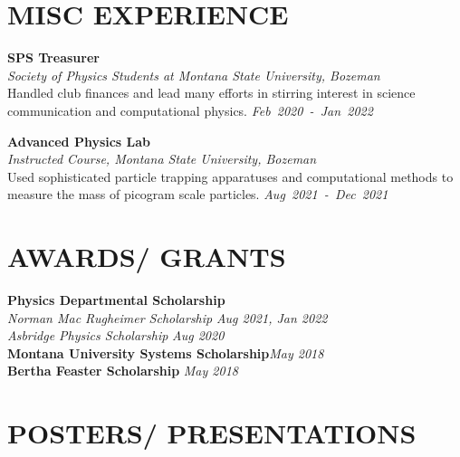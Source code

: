 \documentclass[margin]{res}
\begin{document}
\begin{resume}
\section{MISC EXPERIENCE}
\noindent
\raggedright
\textbf{\textbf{SPS Treasurer}}\\
{\sl Society of Physics Students at Montana State University, Bozeman}\\\vspace{0.5ex}
Handled club finances and lead many efforts in stirring interest in science communication and computational physics.   \hfill
{\sl Feb~2020~-~Jan~2022}

\noindent
\raggedright
\textbf{Advanced Physics Lab}\\
{\sl Instructed Course, Montana State University, Bozeman}\\\vspace{0.5ex}
Used sophisticated particle trapping apparatuses and computational methods to measure the mass of picogram scale particles.  \hfill
{\sl Aug~2021~-~Dec~2021}

\section{AWARDS/ GRANTS}
\textbf{Physics Departmental Scholarship}\\
\hspace{3ex} {\sl Norman Mac Rugheimer Scholarship} \hfill {\sl Aug 2021, Jan 2022}\\\vspace{0.5ex}
\hspace{3ex} {\sl Asbridge Physics Scholarship} \hfill {\sl Aug 2020}\\\vspace{0.5ex}
\textbf{Montana University Systems Scholarship}\hfill\hfil {\sl May 2018}\\\vspace{0.5ex}
\textbf{Bertha Feaster Scholarship} \hfill {\sl May 2018}

\section{POSTERS/ PRESENTATIONS}


\end{resume}
\end{document}
